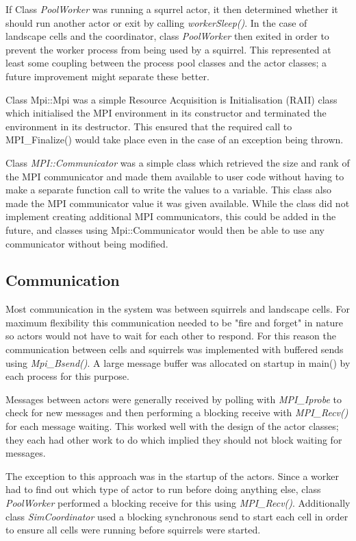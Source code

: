 \documentclass[11pt, oneside]{article}   %
\begin{document}
If Class {\em PoolWorker} was running a squrrel actor, it then determined whether it should run another actor or exit by calling {\em workerSleep()}.
In the case of landscape cells and the coordinator, class {\em PoolWorker} then exited in order to prevent the worker process from being used by a squirrel.
This represented at least some coupling between the process pool classes and the actor classes; a future improvement might separate these better.

Class Mpi::Mpi was a simple Resource Acquisition is Initialisation (RAII) \cite{ref:Stroustrup} class which initialised the MPI environment in its constructor and terminated the environment in its destructor.
This ensured that the required call to MPI\_Finalize() would take place even in the case of an exception being thrown.  

Class {\em MPI::Communicator} was a simple class which retrieved the size and rank of the MPI communicator and made them available to user code without having to make a separate function call to write the values to a variable.
This class also made the MPI communicator value it was given available.
While the class did not implement creating additional MPI communicators, this could be added in the future, and classes using {Mpi::Communicator} would then be able to use any communicator without being modified.

\subsection{Communication}

Most communication in the system was between squirrels and landscape cells.  
For maximum flexibility this communication needed to be "fire and forget" in nature so actors would not have to wait for each other to respond.
For this reason the communication between cells and squirrels was implemented with buffered sends using {\em Mpi\_Bsend()}.
A large message buffer was allocated on startup in main() by each process for this purpose.

Messages between actors were generally received by polling with {\em MPI\_Iprobe} to check for new messages and then performing a blocking receive with {\em MPI\_Recv()} for each message waiting.
This worked well with the design of the actor classes; they each had other work to do which implied they should not block waiting for messages.

The exception to this approach was in the startup of the actors.
Since a worker had to find out which type of actor to run before doing anything else, class {\em PoolWorker} performed a blocking receive for this using {\em MPI\_Recv()}.
Additionally class {\em SimCoordinator} used a blocking synchronous send to start each cell in order to ensure all cells were running before squirrels were started.
\end{document}
